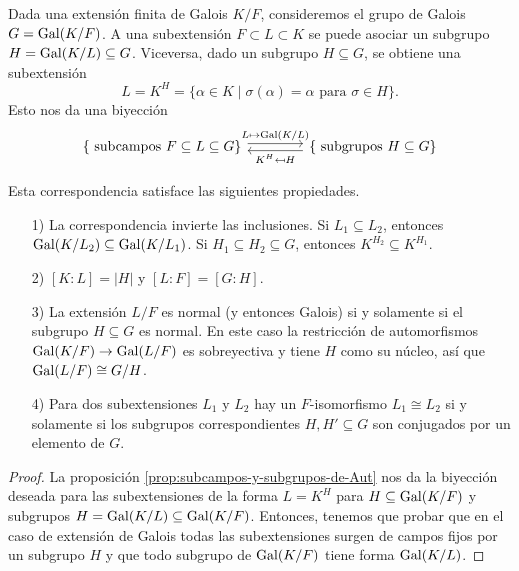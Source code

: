 \begin{teorema}
  \label{thm:correspondencia-de-Galois}
  Dada una extensión finita de Galois $K/F$, consideremos el grupo de Galois
  $G = \operatorname{Gal} (K/F)$.  A una subextensión $F \subset L \subset K$ se puede
  asociar un subgrupo $H = \operatorname{Gal} (K/L) \subseteq G$. Viceversa, dado un subgrupo
  $H \subseteq G$, se obtiene una subextensión
  $$L = K^H = \{ \alpha \in K \mid \sigma (\alpha) = \alpha \text{ para }\sigma\in H \}.$$
  Esto nos da una biyección
  \[ \begin{tikzcd}[column sep=4em]
    \{ \text{ subcampos }F \subseteq L \subseteq G \}
    \ar[shift left=0.25em]{r}{L \mapsto \Gal (K/L)} &
    \{ \text{ subgrupos }H \subseteq G \}
    \ar[shift left=0.25em]{l}{K^H \mapsfrom H}
  \end{tikzcd} \]

  Esta correspondencia satisface las siguientes propiedades.
  \begin{enumerate}
  \item[1)] La correspondencia invierte las inclusiones.
    Si $L_1 \subseteq L_2$, entonces $\operatorname{Gal} (K/L_2) \subseteq \operatorname{Gal} (K/L_1)$.
    Si $H_1 \subseteq H_2 \subseteq G$, entonces $K^{H_2} \subseteq K^{H_1}$.

  \item[2)] $[K:L] = |H|$ y $[L:F] = [G:H]$.

  \item[3)] La extensión $L/F$ es normal (y entonces Galois) si y solamente si
    el subgrupo $H \subseteq G$ es normal. En este caso la restricción de
    automorfismos $\operatorname{Gal} (K/F) \to \operatorname{Gal} (L/F)$ es sobreyectiva y tiene $H$ como
    su núcleo, así que $\operatorname{Gal} (L/F) \cong G/H$.

  \item[4)] Para dos subextensiones $L_1$ y $L_2$ hay un $F$-isomorfismo
    $L_1\cong L_2$ si y solamente si los subgrupos correspondientes
    $H, H' \subseteq G$ son conjugados por un elemento de $G$.
  \end{enumerate}

  \begin{proof}
    La proposición \ref{prop:subcampos-y-subgrupos-de-Aut} nos da la biyección
    deseada para las subextensiones de la forma $L = K^H$ para
    $H \subseteq \operatorname{Gal} (K/F)$ y subgrupos $H = \operatorname{Gal} (K/L) \subseteq \operatorname{Gal} (K/F)$.
    Entonces, tenemos que probar que en el caso de extensión de Galois todas
    las subextensiones surgen de campos fijos por un subgrupo $H$ y que
    todo subgrupo de $\operatorname{Gal} (K/F)$ tiene forma $\operatorname{Gal} (K/L)$.


\end{proof}
\end{teorema}
